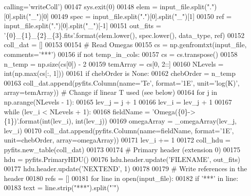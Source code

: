 \begin{DoxyCode}
      calling=\textcolor{stringliteral}{'writeColl'})
00147         sys.exit(0)
00148     elem = input\_file.split(\textcolor{stringliteral}{"."})[0].split(\textcolor{stringliteral}{"\_"})[0]
00149     spec = input\_file.split(\textcolor{stringliteral}{"."})[0].split(\textcolor{stringliteral}{"\_"})[1]
00150     ref = input\_file.split(\textcolor{stringliteral}{"."})[0].split(\textcolor{stringliteral}{"\_"})[-1]
00151     out\_fits = \textcolor{stringliteral}{'\{0\}\_\{1\}\_\{2\}\_\{3\}.fits'}.format(elem.lower(), spec.lower(), data\_type, ref)
00152     coll\_dat = []
00153 
00154     \textcolor{comment}{# Read Omegas}
00155     cs = np.genfromtxt(input\_file, comments=\textcolor{stringliteral}{'***'})
00156     \textcolor{keywordflow}{if} \textcolor{keywordflow}{not} temp\_in\_cols:
00157         cs = cs.transpose()
00158     n\_temp = np.size(cs[0]) - 2
00159     temArray = cs[0, 2::]
00160     NLevels = int(np.max(cs[:, 1]))
00161     \textcolor{keywordflow}{if} chebOrder \textcolor{keywordflow}{is} \textcolor{keywordtype}{None}:
00162         chebOrder = n\_temp
00163     coll\_dat.append(pyfits.Column(name=\textcolor{stringliteral}{'Te'}, format=\textcolor{stringliteral}{'1E'}, unit=\textcolor{stringliteral}{'log(K)'}, array=temArray)) \textcolor{comment}{# Change if
       linear T used (see below)}
00164     \textcolor{keywordflow}{for} j \textcolor{keywordflow}{in} np.arange(NLevels - 1):
00165         lev\_j = j + 1
00166         lev\_i = lev\_j + 1
00167         \textcolor{keywordflow}{while} (lev\_i < NLevels + 1):
00168             fieldName = \textcolor{stringliteral}{'Omega(\{0\}->\{1\})'}.format(int(lev\_i), int(lev\_j))
00169             omegaArray = \_omegaArray(lev\_j, lev\_i)
00170             coll\_dat.append(pyfits.Column(name=fieldName, format=\textcolor{stringliteral}{'1E'}, unit=chebOrder, array=omegaArray))
00171             lev\_i += 1
00172     coll\_hdu = pyfits.new\_table(coll\_dat)        
00173             
00174     \textcolor{comment}{# Primary header (extension 0)}
00175     hdu = pyfits.PrimaryHDU()
00176     hdu.header.update(\textcolor{stringliteral}{'FILENAME'}, out\_fits)
00177     hdu.header.update(\textcolor{stringliteral}{'NEXTEND'}, 1)
00178  
00179     \textcolor{comment}{# Write references in the header}
00180     refs = []
00181     \textcolor{keywordflow}{for} line \textcolor{keywordflow}{in} open(input\_file):
00182         \textcolor{keywordflow}{if} \textcolor{stringliteral}{'***'} \textcolor{keywordflow}{in} line:
00183             text = line.strip(\textcolor{stringliteral}{"***"}).split(\textcolor{stringliteral}{"'"})

\end{DoxyCode}
